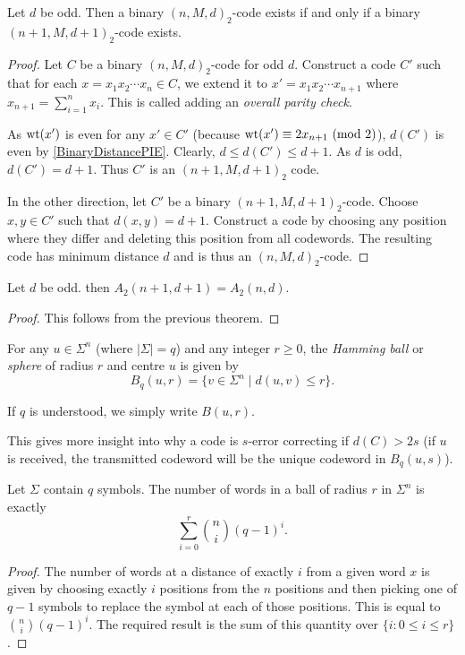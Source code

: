 \begin{theorem}
    Let $d$ be odd. Then a binary $(n,M,d)_2$-code exists if and only if a binary $(n+1,M,d+1)_2$-code exists.
\end{theorem}
\begin{proof}
    Let $C$ be a binary $(n,M,d)_2$-code for odd $d$. Construct a code $C'$ such that for each $x=x_1x_2\cdots x_n\in C$, we extend it to $x'=x_1x_2\cdots x_{n+1}$ where $x_{n+1}=\sum_{i=1}^n x_i$. This is called adding an \textit{overall parity check}.
    
    \vspace{1mm}
    As $\operatorname{wt}(x')$ is even for any $x'\in C'$ (because $\operatorname{wt}(x')\equiv 2x_{n+1}\ (\mathrm{mod}\ 2)$), $d(C')$ is even by \ref{BinaryDistancePIE}. Clearly, $d\leq d(C')\leq d+1$. As $d$ is odd, $d(C')=d+1$. Thus $C'$ is an $(n+1,M,d+1)_2$ code.
    
    \vspace{2mm}
    In the other direction, let $C'$ be a binary $(n+1,M,d+1)_2$-code. Choose $x,y\in C'$ such that $d(x,y)=d+1$. Construct a code by choosing any position where they differ and deleting this position from all codewords. The resulting code has minimum distance $d$ and is thus an $(n,M,d)_2$-code.
\end{proof}

\begin{corollary}
    Let $d$ be odd. then $A_2(n+1,d+1)=A_2(n,d)$.
\end{corollary}
\begin{proof}
    This follows from the previous theorem.
\end{proof}

\begin{definition}
    For any $u\in\Sigma^n$ (where $|\Sigma|=q$) and any integer $r\geq 0$, the \textit{Hamming ball} or \textit{sphere} of radius $r$ and centre $u$ is given by
    $$B_q(u,r)=\{v\in\Sigma^n\mid d(u,v)\leq r\}.$$
\end{definition}

If $q$ is understood, we simply write $B(u,r)$.

\vspace{2mm}
This gives more insight into why a code is $s$-error correcting if $d(C)>2s$ (if $u$ is received, the transmitted codeword will be the unique codeword in $B_q(u,s)$).

\begin{lemma}
\label{numWordsInSphere}
    Let $\Sigma$ contain $q$ symbols. The number of words in a ball of radius $r$ in $\Sigma^n$ is exactly
    $$\sum_{i=0}^r \binom{n}{i}(q-1)^i.$$
\end{lemma}
\begin{proof}
    The number of words at a distance of exactly $i$ from a given word $x$ is given by choosing exactly $i$ positions from the $n$ positions and then picking one of $q-1$ symbols to replace the symbol at each of those positions. This is equal to $\binom{n}{i}(q-1)^i$. The required result is the sum of this quantity over $\{i:0\leq i\leq r\}$.
\end{proof}

